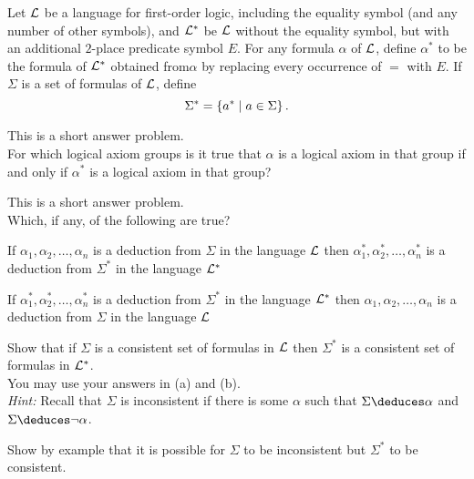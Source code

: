 \begin{problem}
  Let $\mathcal{L}$ be a language for first-order logic, including the equality symbol
  (and any number of other symbols),
  and $\mathcal{L}^*$ be $\mathcal{L}$ without the equality symbol,
  but with an additional $2$-place predicate symbol $E$.
  For any formula $\alpha$ of $\mathcal{L}$, define $\alpha^*$ to be the formula
  of $\mathcal{L}^*$ obtained from$\alpha$ by replacing every occurrence of
  $=$ with $E$. If $\Sigma$ is a set of formulas of $\mathcal{L}$,
  define \[ \Sigma^* = \left\{ a^* \mid a \in \Sigma \right\}. \]

  \begin{enumalph}
    \item This is a short answer problem.\\
      For which logical axiom groups is it true that $\alpha$ is a logical
      axiom in that group if and only if $\alpha^*$ is a logical axiom in
      that group?
      \begin{Answer}

      \end{Answer}
      
    \item This is a short answer problem.\\
      Which, if any, of the following are true?
      \begin{enumroman}
        \item If $\alpha_1, \alpha_2, \ldots, \alpha_n$
          is a deduction from $\Sigma$ in the language $\mathcal{L}$
          then $\alpha^*_1, \alpha^*_2, \ldots, \alpha^*_n$
          is a deduction from $\Sigma^*$ in the language $\mathcal{L}^*$
          \begin{Answer}
            
          \end{Answer}
        \item If $\alpha^*_1, \alpha^*_2, \ldots, \alpha^*_n$
          is a deduction from $\Sigma^*$ in the language $\mathcal{L}^*$
          then $\alpha_1, \alpha_2, \ldots, \alpha_n$
          is a deduction from $\Sigma$ in the language $\mathcal{L}$
          \begin{Answer}

          \end{Answer}
      \end{enumroman}
    \item Show that if $\Sigma$ is a consistent set of formulas in $\mathcal{L}$
      then $\Sigma^*$ is a consistent set of formulas in $\mathcal{L}^*$.\\
      You may use your answers in (a) and (b).\\
      \emph{Hint: } Recall that $\Sigma$ is inconsistent if there is
      some $\alpha$ such that $\Sigma \deduces \alpha$ and
      $\Sigma \deduces \lnot \alpha$.

    \item Show by example that it is possible for $\Sigma$ to be inconsistent
      but $\Sigma^*$ to be consistent.
      \begin{Answer}
        
      \end{Answer}
  \end{enumalph}

\end{problem}
